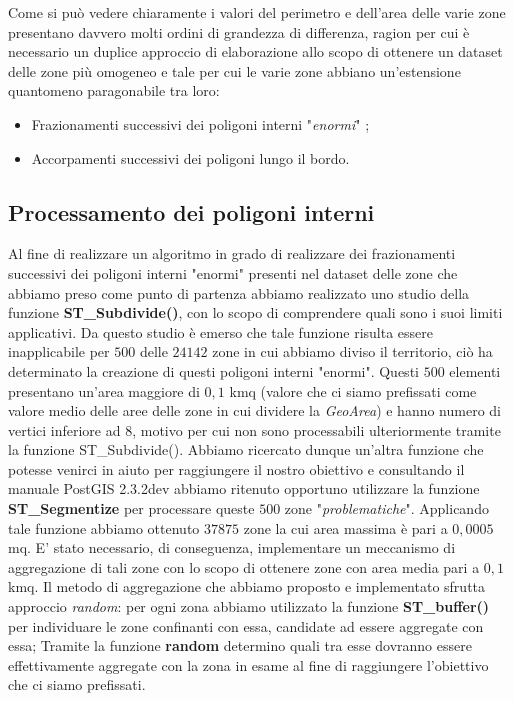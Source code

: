 Come si può vedere chiaramente i valori del perimetro e dell'area delle varie zone presentano davvero molti ordini di grandezza di differenza, ragion per cui è necessario un duplice approccio di elaborazione allo scopo di ottenere un dataset delle zone più omogeneo e tale per cui le varie zone abbiano un'estensione quantomeno paragonabile tra loro:
\begin{itemize}
\item Frazionamenti successivi dei poligoni interni "\textit{enormi}" ;
\item Accorpamenti successivi dei poligoni lungo il bordo.
\end{itemize}
\subsection{Processamento dei poligoni interni}
Al fine di realizzare un algoritmo in grado di realizzare dei frazionamenti successivi dei poligoni interni "enormi" presenti nel dataset delle zone che abbiamo preso come punto di partenza abbiamo realizzato uno studio della funzione \textbf{ST\_Subdivide()}, con lo scopo di comprendere quali sono i suoi limiti applicativi. Da questo studio è emerso che tale funzione risulta essere inapplicabile per $500$ delle $24142$ zone in cui abbiamo diviso il territorio, ciò ha determinato la creazione di questi poligoni interni "enormi". Questi $500$ elementi presentano un'area maggiore di $0,1$ kmq (valore che ci siamo prefissati come valore medio delle aree delle zone in cui dividere la \textit{GeoArea}) e hanno numero di vertici inferiore ad $8$, motivo per cui non sono processabili ulteriormente tramite la funzione ST\_Subdivide().\newline
Abbiamo ricercato dunque un'altra funzione che potesse venirci in aiuto per raggiungere il nostro obiettivo e consultando il manuale PostGIS 2.3.2dev abbiamo ritenuto opportuno utilizzare la funzione \textbf{ST\_Segmentize} per processare queste $500$ zone "\textit{problematiche}". Applicando tale funzione abbiamo ottenuto $37875$ zone la cui area massima è pari a $0,0005$ mq. E' stato necessario, di conseguenza, implementare un meccanismo di aggregazione di tali zone con lo scopo di ottenere zone con area media pari a $0,1$ kmq. Il metodo di aggregazione che abbiamo proposto e implementato sfrutta approccio \textit{random}: per ogni zona abbiamo utilizzato la funzione \textbf{ST\_buffer()} 
per individuare le zone confinanti con essa, candidate ad essere aggregate con essa; Tramite la funzione \textbf{random} determino quali tra esse dovranno essere effettivamente aggregate con la zona in esame al fine di raggiungere l'obiettivo che ci siamo prefissati.

